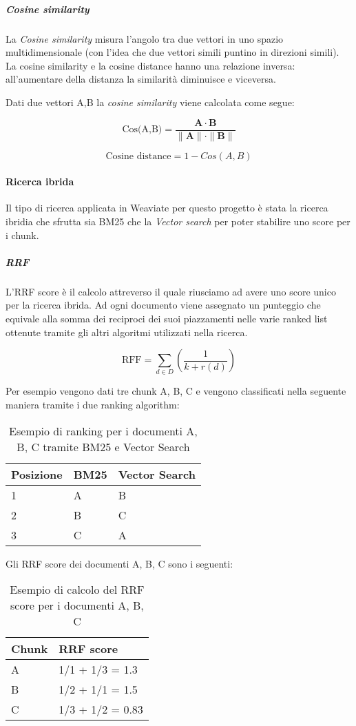 \subparagraph{Cosine similarity}
La \emph{Cosine similarity} misura l'angolo tra due vettori in uno spazio multidimensionale (con l'idea che due vettori simili puntino in direzioni simili).
La cosine similarity e la cosine distance hanno una relazione inversa: all'aumentare della distanza la similarità diminuisce e viceversa.

\noindent Dati due vettori A,B la \emph{cosine similarity} viene calcolata come segue:

\[
\text{Cos(A,B)} = \frac{{\mathbf{A} \cdot \mathbf{B}}}{{\|\mathbf{A}\| \cdot \|\mathbf{B}\|}}    
\]

\[
\text{Cosine distance} = 1-Cos(A,B)
\]

\paragraph{Ricerca ibrida}
Il tipo di ricerca applicata in Weaviate per questo progetto è stata la ricerca ibridia che sfrutta sia BM25 che la \emph{Vector search} per poter stabilire uno score per i chunk.

\subparagraph{\gls{RRF}}
L'RRF score è il calcolo attreverso il quale riusciamo ad avere uno score unico per la ricerca ibrida.
Ad ogni documento viene assegnato un punteggio che equivale alla somma dei reciproci dei suoi piazzamenti nelle varie ranked list ottenute tramite gli altri algoritmi utilizzati nella ricerca.

\[
\text{RFF} = \sum_{d \in D} (\frac{1}{k+r(d)})    
\]

\noindent Per esempio vengono dati tre chunk A, B, C e vengono classificati nella seguente maniera tramite i due ranking algorithm:

\begin{table}[H]
    \centering
    \begin{tabular}{|p{2cm} |p{2cm} |p{2cm}|}
        \hline
        Posizione & BM25 & Vector Search \\
        \hline
        1 & A & B \\
        \hline
        2 & B & C \\
        \hline
        3 & C & A \\
        \hline
    \end{tabular}
    \caption{Esempio di ranking per i documenti A, B, C tramite BM25 e Vector Search}
\end{table}

\noindent Gli RRF score dei documenti A, B, C sono i seguenti:
\begin{table}[H]
    \centering
    \begin{tabular}{|p{3cm} | p{3cm} |}
        \hline
        Chunk & RRF score \\
        \hline
        A & 1/1 + 1/3 = 1.3\\
        \hline
        B & 1/2 + 1/1 = 1.5\\
        \hline
        C & 1/3 + 1/2 = 0.83\\
        \hline
    \end{tabular}
    \caption{Esempio di calcolo del RRF score per i documenti A, B, C}
\end{table}

